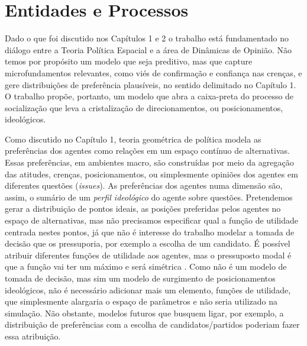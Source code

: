 \section{Entidades e Processos}

Dado o que foi discutido nos Capítulos 1 e 2 o trabalho está fundamentado no
diálogo entre a Teoria Política Espacial e a área de Dinâmicas de Opinião. Não
temos por propósito um modelo que seja preditivo, mas que capture
microfundamentos relevantes, como viés de confirmação e confiança nas crenças, e
gere distribuições de preferência plausíveis, no sentido delimitado no Capítulo
1. O trabalho propõe, portanto, um modelo que abra a caixa-preta do processo de
socialização que leva a cristalização de direcionamentos, ou posicionamentos,
ideológicos.

Como discutido no Capítulo 1, teoria geométrica de política modela as
preferências dos agentes como relações em um espaço contínuo de alternativas.
Essas preferências, em ambientes macro, são construídas por meio da agregação
das atitudes, crenças, posicionamentos, ou simplesmente opiniões dos agentes em
diferentes questões (\textit{issues}). As preferências dos agentes numa dimensão
são, assim, o sumário de um \textit{perfil ideológico} do agente sobre questões.
Pretendemos gerar a distribuição de pontos ideais, as posições preferidas pelos
agentes no espaço de alternativas, mas não precisamos especificar qual a função
de utilidade centrada nestes pontos, já que não é interesse do trabalho modelar
a tomada de decisão que os pressuporia, por exemplo a escolha de um candidato. É
possível atribuir diferentes funções de utilidade aos agentes, mas o pressuposto
modal é que a função vai ter um máximo e será simétrica \cite{eguia2013spatial,
  carroll2013structure}. Como não é um modelo de tomada de decisão, mas sim um
modelo de surgimento de posicionamentos ideológicos, não é necessário adicionar
mais um elemento, funções de utilidade, que simplesmente alargaria o espaço de
parâmetros e não seria utilizado na simulação. Não obstante, modelos futuros que
busquem ligar, por exemplo, a distribuição de preferências com a escolha de
candidatos/partidos poderiam fazer essa atribuição.


